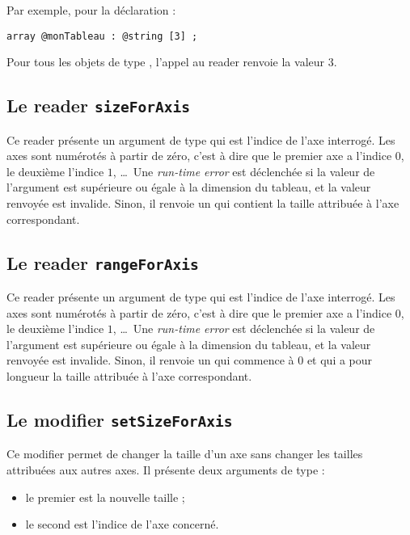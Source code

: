 Par exemple, pour la déclaration :
\begin{lstlisting}[language=galgas]
array @monTableau : @string [3] ;
\end{lstlisting}
Pour tous les objets de type , l'appel au reader  renvoie la valeur $3$.


\subsection{Le reader \texttt{sizeForAxis}}

Ce reader présente un argument de type  qui est l'indice de l'axe interrogé. Les axes sont numérotés à partir de zéro, c'est à dire que le premier axe a l'indice $0$, le deuxième l'indice $1$, \dots~Une \emph{run-time error} est déclenchée si la valeur de l'argument est supérieure ou égale à la dimension du tableau, et la valeur renvoyée est invalide. Sinon, il renvoie un  qui contient la taille attribuée à l'axe correspondant.


\subsection{Le reader \texttt{rangeForAxis}}

Ce reader présente un argument de type  qui est l'indice de l'axe interrogé. Les axes sont numérotés à partir de zéro, c'est à dire que le premier axe a l'indice $0$, le deuxième l'indice $1$, \dots~Une \emph{run-time error} est déclenchée si la valeur de l'argument est supérieure ou égale à la dimension du tableau, et la valeur renvoyée est invalide. Sinon, il renvoie un  qui commence à $0$ et qui a pour longueur la taille attribuée à l'axe correspondant.




\subsection{Le modifier \texttt{setSizeForAxis}}

Ce modifier permet de changer la taille d'un axe sans changer les tailles attribuées aux autres axes. Il présente deux arguments de type  :
\begin{itemize}
  \item le premier est la nouvelle taille ;
  \item le second est l'indice de l'axe concerné.
\end{itemize}

